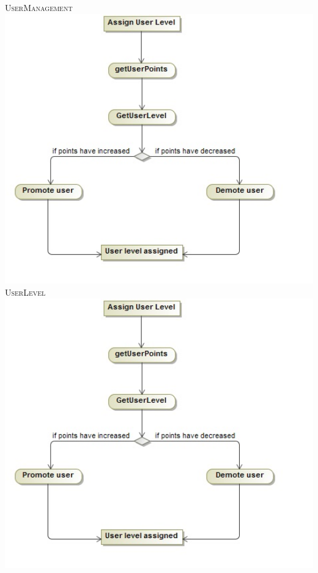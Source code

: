\documentclass[a4paper,12pt]{report}
\begin{document}
\newpage
\textsc{UserManagement}
\emph{}\\
\includegraphics[width=1\textwidth]{./Use_Case_Diagram_UserManagement.jpg}\\[0.4cm] 

\newpage
\textsc{UserLevel}
\emph{}\\
\includegraphics[width=1\textwidth]{./Activity_Diagram_UserLevel.jpg}\\[0.4cm]
\end{document}
